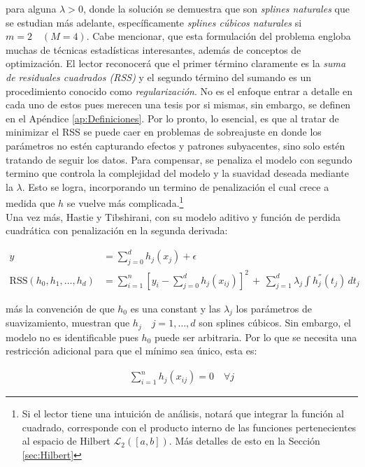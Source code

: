 \documentclass[../Main/Main.tex]{subfiles}
\begin{document}
para alguna $\lambda > 0$, donde la solución se demuestra que son \textit{splines naturales} que se estudian más adelante, específicamente \textit{splines cúbicos naturales} si $m = 2\quad (M = 4)$. Cabe mencionar, que esta formulación del problema engloba muchas de técnicas estadísticas interesantes, además de conceptos de optimización. El lector reconocerá que el primer término claramente es la \textit{suma de residuales cuadrados (RSS)} y el segundo término del sumando es un procedimiento conocido como \textit{regularización}. No es el enfoque entrar a detalle en cada uno de estos pues merecen una tesis por si mismas, sin embargo, se definen en el Apéndice \ref{ap:Definiciones}. Por lo pronto, lo esencial, es que al tratar de minimizar el RSS se puede caer en problemas de sobreajuste en donde los parámetros no estén capturando efectos y patrones subyacentes, sino solo estén tratando de seguir los datos. Para compensar, se penaliza el modelo con segundo termino que controla la complejidad del modelo y la suavidad deseada mediante la $\lambda$. Esto se logra, incorporando un termino de penalización el cual crece a medida que $h$ se vuelve más complicada.\footnote{Si el lector tiene una intuición de análisis, notará que integrar la función al cuadrado, corresponde con el producto interno de las funciones pertenecientes al espacio de Hilbert $\mathcal{L}_2([a,b])$. Más detalles de esto en la Sección \ref{sec:Hilbert}} \\

Una vez más, Hastie y Tibshirani, con su modelo aditivo y función de perdida cuadrática con penalización en la segunda derivada:

\begin{align*}
	y &= \sum_{j = 0}^d h_j(x_j) + \epsilon \\	
	\text{RSS}(h_0, h_1, \ldots, h_d) &= \sum_{i = 1}^n[y_i - \sum_{j = 0}^d h_j(x_{ij})]^2 \, + \, \sum_{j = 1}^d\lambda_j 			\int h_j^{''}(t_j) \, dt_j
\end{align*}

más la convención de que $h_0$ es una constant y las $\lambda_j$ los parámetros de suavizamiento, muestran que $h_j \quad j = 1,\ldots,d$ son splines cúbicos. Sin embargo, el modelo no es identificable pues $h_0$ puede ser arbitraria. Por lo que se necesita una restricción adicional para que el mínimo sea único, esta es:

\begin{align}
	\sum_{i = 1}^n h_j(x_{ij}) = 0 \quad \forall j \label{ec:RestriccionGAM}
\end{align}
\end{document}
